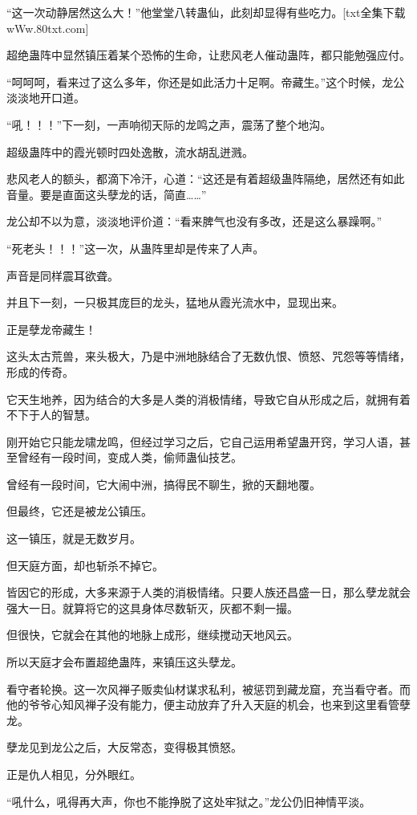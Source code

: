 \begin{this_body}
“这一次动静居然这么大！”他堂堂八转蛊仙，此刻却显得有些吃力。[txt全集下载wWw.80txt.com]

超绝蛊阵中显然镇压着某个恐怖的生命，让悲风老人催动蛊阵，都只能勉强应付。

“呵呵呵，看来过了这么多年，你还是如此活力十足啊。帝藏生。”这个时候，龙公淡淡地开口道。

“吼！！！”下一刻，一声响彻天际的龙鸣之声，震荡了整个地沟。

超级蛊阵中的霞光顿时四处逸散，流水胡乱迸溅。

悲风老人的额头，都滴下冷汗，心道：“这还是有着超级蛊阵隔绝，居然还有如此音量。要是直面这头孽龙的话，简直……”

龙公却不以为意，淡淡地评价道：“看来脾气也没有多改，还是这么暴躁啊。”

“死老头！！！”这一次，从蛊阵里却是传来了人声。

声音是同样震耳欲聋。

并且下一刻，一只极其庞巨的龙头，猛地从霞光流水中，显现出来。

正是孽龙帝藏生！

这头太古荒兽，来头极大，乃是中洲地脉结合了无数仇恨、愤怒、咒怨等等情绪，形成的传奇。

它天生地养，因为结合的大多是人类的消极情绪，导致它自从形成之后，就拥有着不下于人的智慧。

刚开始它只能龙啸龙鸣，但经过学习之后，它自己运用希望蛊开窍，学习人语，甚至曾经有一段时间，变成人类，偷师蛊仙技艺。

曾经有一段时间，它大闹中洲，搞得民不聊生，掀的天翻地覆。

但最终，它还是被龙公镇压。

这一镇压，就是无数岁月。

但天庭方面，却也斩杀不掉它。

皆因它的形成，大多来源于人类的消极情绪。只要人族还昌盛一日，那么孽龙就会强大一日。就算将它的这具身体尽数斩灭，灰都不剩一撮。

但很快，它就会在其他的地脉上成形，继续搅动天地风云。

所以天庭才会布置超绝蛊阵，来镇压这头孽龙。

看守者轮换。这一次风禅子贩卖仙材谋求私利，被惩罚到藏龙窟，充当看守者。而他的爷爷心知风禅子没有能力，便主动放弃了升入天庭的机会，也来到这里看管孽龙。

孽龙见到龙公之后，大反常态，变得极其愤怒。

正是仇人相见，分外眼红。

“吼什么，吼得再大声，你也不能挣脱了这处牢狱之。”龙公仍旧神情平淡。


\end{this_body}
